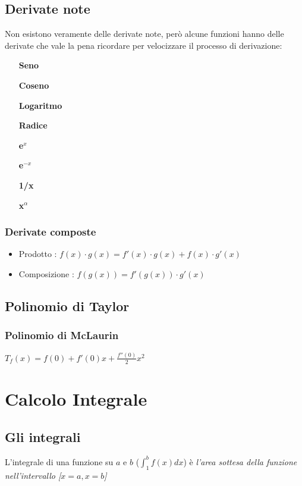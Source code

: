 \documentclass[12pt, a4paper, openany]{book}
\newcommand{\definizione}[1]{\begin{box_definizione} #1 \end{box_definizione}}
\begin{document}
\section{Derivate note}
Non esistono veramente delle derivate note, però alcune funzioni hanno delle derivate che vale la pena ricordare per velocizzare il processo di derivazione:

\begin{itemize}
    \item[\textbf{Seno}] 
    \item[\textbf{Coseno}] 
    \item[\textbf{Logaritmo}] 
    \item[\textbf{Radice}] 
    \item[\textbf{e$^x$}] 
    \item[\textbf{e$^{-x}$}] 
    \item[\textbf{1/x}] 
    \item[\textbf{x$^\alpha$}] 
\end{itemize}
\subsection{Derivate composte}
\begin{itemize}
    \item Prodotto : $f(x) \cdot g(x) = f'(x) \cdot g(x) + f(x) \cdot g'(x)$
    \item Composizione : $f(g(x)) = f'(g(x)) \cdot g'(x)$
\end{itemize}



\section{Polinomio di Taylor}
\subsection*{Polinomio di McLaurin}
$T_f(x) = f(0) + f'(0)x + \frac{f''(0)}{2}x^2$

\chapter{Calcolo Integrale}
\section{Gli integrali}
\definizione{
    L'integrale di una funzione su $a$ e $b$ ($\int_{1}^{b} f(x)dx$) è \emph{l'area sottesa della funzione nell'intervallo [$x=a, x=b$]}
}
\end{document}
